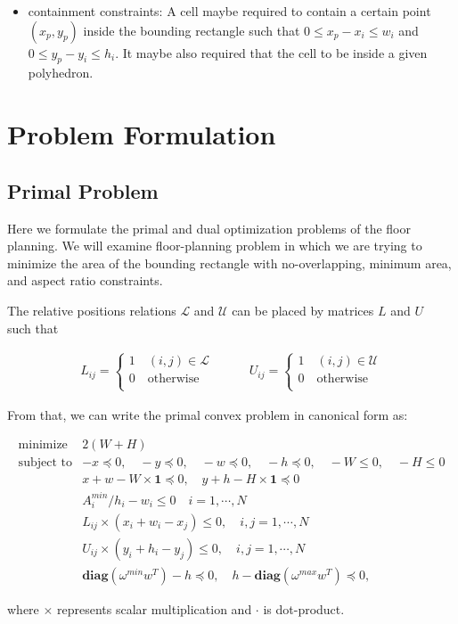 \documentclass[12pt] {article}
\begin{document}
\begin{itemize}
\item containment constraints: A cell maybe required to contain a certain point $(x_{p},y_{p})$ inside the bounding rectangle such that $0\leq x_{p}-x_{i}\leq w_{i}$ and $0\leq y_{p}-y_{i}\leq h_{i}$. It maybe also required that the cell to be inside a given polyhedron. 

\end{itemize}
\section{Problem Formulation}
\subsection*{Primal Problem}
Here we formulate the primal and dual optimization problems of the floor planning. We will examine floor-planning problem in which we are trying to minimize the area of the bounding rectangle with no-overlapping, minimum area, and aspect ratio constraints. 

The relative positions relations $\mathscr{L}$ and $\mathscr{U}$ can be placed by matrices $L$ and $U$~\citep{moh1996globally} such that 
\begin{small}
\[
\begin{array}{cc}
L_{ij}=
\begin{cases}
	1 \quad (i,j)\in \mathscr{L} \\
	0 \quad \text{otherwise} \\
\end{cases} 
&
\quad \quad
U_{ij}=
\begin{cases}
	1 \quad (i,j)\in \mathscr{U} \\
	0 \quad \text{otherwise} \\
\end{cases} 
\end{array} 
\]
\end{small}
From that, we can write the primal convex problem in canonical form as:
\begin{small}
\begin{equation}
\begin{array}{cl}
\text{minimize} & 2(W+H) \\
\text{subject to} & -x \preceq 0, \quad -y\preceq 0, \quad -w \preceq 0, \quad -h \preceq 0, \quad -W\leq 0, \quad -H \leq 0\\
& x+w - W\times \textbf{1}\preceq0, \quad y+h -H\times  \textbf{1} \preceq 0\\
& A_{i}^{min}/h_{i}-w_{i}\leq 0 \quad i=1,\cdots, N\\
& L_{ij}\times(x_{i}+w_{i}-x_{j})\leq 0, \quad i,j=1,\cdots, N\\
& U_{ij}\times(y_{i}+h_{i}-y_{j})\leq 0, \quad i,j=1,\cdots, N\\
& \textbf{diag}(\omega^{min}w^{T}) - h \preceq 0, \quad h - \textbf{diag}(\omega^{max}w^{T}) \preceq 0,
\end{array} 
\label{eq:pp}
\end{equation}
\end{small}
where $\times$ represents scalar multiplication and $\cdot$ is dot-product.
\end{document}
